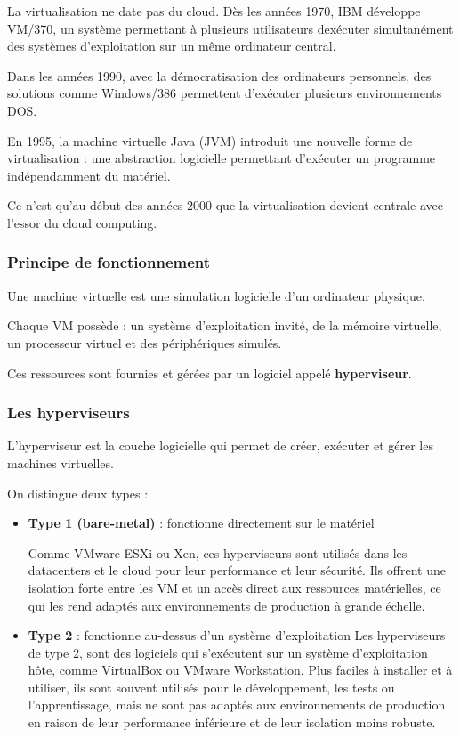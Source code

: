 \documentclass{rapportClass} %
\begin{document}
La virtualisation ne date pas du cloud. Dès les années 1970, IBM développe VM/370, un système permettant à plusieurs utilisateurs dexécuter simultanément des systèmes d’exploitation sur un même ordinateur central.

Dans les années 1990, avec la démocratisation des ordinateurs personnels, des solutions comme Windows/386 permettent d’exécuter plusieurs environnements DOS.

En 1995, la machine virtuelle Java (JVM) introduit une nouvelle forme de virtualisation : une abstraction logicielle permettant d’exécuter un programme indépendamment du matériel.

Ce n’est qu’au début des années 2000 que la virtualisation devient centrale avec l’essor du cloud computing.

\subsubsection{Principe de fonctionnement}

Une machine virtuelle est une simulation logicielle d’un ordinateur physique.

Chaque VM possède : un système d’exploitation invité, de la mémoire virtuelle, un processeur virtuel et des périphériques simulés.

Ces ressources sont fournies et gérées par un logiciel appelé \textbf{hyperviseur}.

\subsubsection{Les hyperviseurs}

L’hyperviseur est la couche logicielle qui permet de créer, exécuter et gérer les machines virtuelles.

On distingue deux types :

\begin{itemize}
\item \textbf{Type 1 (bare-metal)} : fonctionne directement sur le matériel

Comme VMware ESXi ou Xen, ces hyperviseurs sont utilisés dans les datacenters et le cloud pour leur performance et leur sécurité.
Ils offrent une isolation forte entre les VM et un accès direct aux ressources matérielles, ce qui les rend adaptés aux environnements de production à grande échelle. 

\item \textbf{Type 2} : fonctionne au-dessus d’un système d’exploitation
Les hyperviseurs de type 2, sont des logiciels qui s’exécutent sur un système d’exploitation hôte, comme VirtualBox ou VMware Workstation.
Plus faciles à installer et à utiliser, ils sont souvent utilisés pour le développement, les tests ou l’apprentissage, 
mais ne sont pas adaptés aux environnements de production en raison de leur performance inférieure et de leur isolation moins robuste.
\end{itemize}
\end{document}
